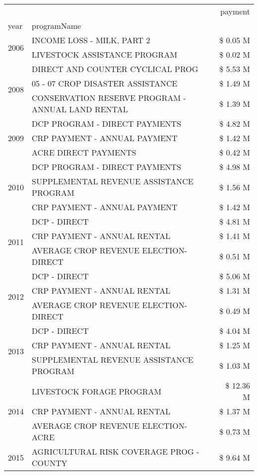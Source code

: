 \begin{tabular}{llr}
\toprule
 &  & payment \\
year & programName &  \\
\midrule
\multirow[t]{2}{*}{2006} & INCOME LOSS - MILK, PART 2 & \$ 0.05 M \\
 & LIVESTOCK ASSISTANCE PROGRAM & \$ 0.02 M \\
\cline{1-3}
\multirow[t]{3}{*}{2008} & DIRECT AND COUNTER CYCLICAL PROG & \$ 5.53 M \\
 & 05 - 07 CROP DISASTER ASSISTANCE & \$ 1.49 M \\
 & CONSERVATION RESERVE PROGRAM - ANNUAL LAND RENTAL & \$ 1.39 M \\
\cline{1-3}
\multirow[t]{3}{*}{2009} & DCP PROGRAM - DIRECT PAYMENTS & \$ 4.82 M \\
 & CRP PAYMENT - ANNUAL PAYMENT & \$ 1.42 M \\
 & ACRE DIRECT PAYMENTS & \$ 0.42 M \\
\cline{1-3}
\multirow[t]{3}{*}{2010} & DCP PROGRAM - DIRECT PAYMENTS & \$ 4.98 M \\
 & SUPPLEMENTAL REVENUE ASSISTANCE PROGRAM & \$ 1.56 M \\
 & CRP PAYMENT - ANNUAL PAYMENT & \$ 1.42 M \\
\cline{1-3}
\multirow[t]{3}{*}{2011} & DCP - DIRECT & \$ 4.81 M \\
 & CRP PAYMENT - ANNUAL RENTAL & \$ 1.41 M \\
 & AVERAGE CROP REVENUE ELECTION-DIRECT & \$ 0.51 M \\
\cline{1-3}
\multirow[t]{3}{*}{2012} & DCP - DIRECT & \$ 5.06 M \\
 & CRP PAYMENT - ANNUAL RENTAL & \$ 1.31 M \\
 & AVERAGE CROP REVENUE ELECTION-DIRECT & \$ 0.49 M \\
\cline{1-3}
\multirow[t]{3}{*}{2013} & DCP - DIRECT & \$ 4.04 M \\
 & CRP PAYMENT - ANNUAL RENTAL & \$ 1.25 M \\
 & SUPPLEMENTAL REVENUE ASSISTANCE PROGRAM & \$ 1.03 M \\
\cline{1-3}
\multirow[t]{3}{*}{2014} & LIVESTOCK FORAGE PROGRAM & \$ 12.36 M \\
 & CRP PAYMENT - ANNUAL RENTAL & \$ 1.37 M \\
 & AVERAGE CROP REVENUE ELECTION-ACRE & \$ 0.73 M \\
\cline{1-3}
\multirow[t]{3}{*}{2015} & AGRICULTURAL RISK COVERAGE PROG - COUNTY & \$ 9.64 M \\

\end{tabular}
